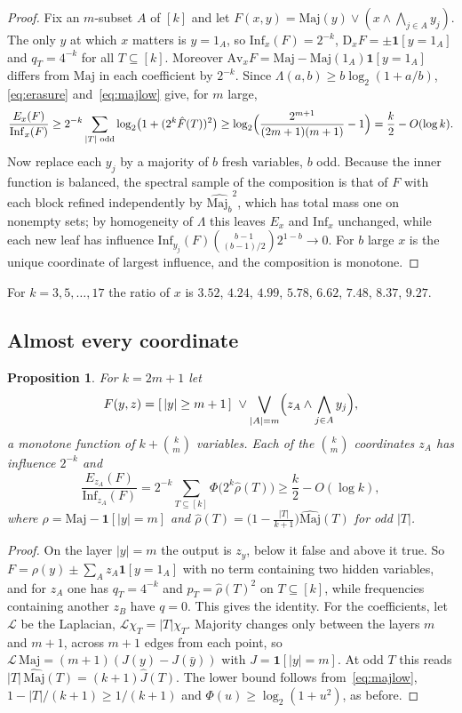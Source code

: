 \documentclass[11pt]{amsart}
\newtheorem{proposition}[theorem]{Proposition}
\theoremstyle{definition}
\theoremstyle{remark}
\newcommand{\Inf}{\mathrm{Inf}}
\begin{document}
\begin{proof}
Fix an $m$-subset $A$ of $[k]$ and let $F(x,y)=\mathrm{Maj}(y)\vee(x\wedge\bigwedge_{j\in A}y_j)$. The only $y$ at which
$x$ matters is $y=1_A$, so $\Inf_x(F)=2^{-k}$, $\mathrm D_xF=\pm\mathbf 1[y=1_A]$ and $q_T=4^{-k}$ for all $T\subseteq[k]$.
Moreover $\mathrm{Av}_xF=\mathrm{Maj}-\mathrm{Maj}(1_A)\mathbf 1[y=1_A]$ differs from $\mathrm{Maj}$ in each coefficient by $2^{-k}$.
Since $\Lambda(a,b)\ge b\log_2(1+a/b)$, \eqref{eq:erasure} and~\eqref{eq:majlow} give, for $m$ large,
\[
\frac{E_x(F)}{\Inf_x(F)}\ge2^{-k}\sum_{|T|\text{ odd}}\log_2\bigl(1+(2^k\hat F(T))^2\bigr)
\ge\log_2\Bigl(\frac{2^{m+1}}{(2m+1)(m+1)}-1\Bigr)=\frac k2-O(\log k).
\]
Now replace each $y_j$ by a majority of $b$ fresh variables, $b$ odd. Because the inner function is balanced, the
spectral sample of the composition is that of $F$ with each block refined independently by $\hat{\mathrm{Maj}_b}^2$,
which has total mass one on nonempty sets; by homogeneity of $\Lambda$ this leaves $E_x$ and $\Inf_x$ unchanged, while each
new leaf has influence $\Inf_{y_j}(F)\binom{b-1}{(b-1)/2}2^{1-b}\to0$. For $b$ large $x$ is the unique coordinate of
largest influence, and the composition is monotone.
\end{proof}

For $k=3,5,\dots,17$ the ratio of $x$ is $3.52$, $4.24$, $4.99$, $5.78$, $6.62$, $7.48$, $8.37$, $9.27$.

\subsection{Almost every coordinate}

\begin{proposition}\label{prop:middle}
For $k=2m+1$ let
\[
F(y,z)=[\,|y|\ge m+1\,]\ \vee\bigvee_{|A|=m}\Bigl(z_A\wedge\bigwedge_{j\in A}y_j\Bigr),
\]
a monotone function of $k+\binom km$ variables. Each of the $\binom km$ coordinates $z_A$ has influence $2^{-k}$ and
\[
\frac{E_{z_A}(F)}{\Inf_{z_A}(F)}=2^{-k}\sum_{T\subseteq[k]}\Phi\bigl(2^k\hat \rho(T)\bigr)\ge\frac k2-O(\log k),
\]
where $\rho=\mathrm{Maj}-\mathbf 1[|y|=m]$ and $\hat \rho(T)=\bigl(1-\tfrac{|T|}{k+1}\bigr)\hat{\mathrm{Maj}}(T)$ for odd $|T|$.
\end{proposition}

\begin{proof}
On the layer $|y|=m$ the output is $z_y$, below it false and above it true. So $F=\rho(y)\pm\sum_A z_A\mathbf 1[y=1_A]$
with no term containing two hidden variables, and for $z_A$ one has $q_T=4^{-k}$ and $p_T=\hat \rho(T)^2$ on
$T\subseteq[k]$, while frequencies containing another $z_B$ have $q=0$. This gives the identity. For the coefficients,
let $\mathcal L$ be the Laplacian, $\mathcal L\chi_T=|T|\chi_T$. Majority changes only between the layers $m$ and $m+1$,
across $m+1$ edges from each point, so $\mathcal L\,\mathrm{Maj}=(m+1)(J(y)-J(\bar y))$ with $J=\mathbf 1[|y|=m]$. At odd
$T$ this reads $|T|\,\hat{\mathrm{Maj}}(T)=(k+1)\hat J(T)$. The lower bound follows from~\eqref{eq:majlow}, $1-|T|/(k+1)\ge1/(k+1)$
and $\Phi(u)\ge\log_2(1+u^2)$, as before.
\end{proof}
\end{document}
